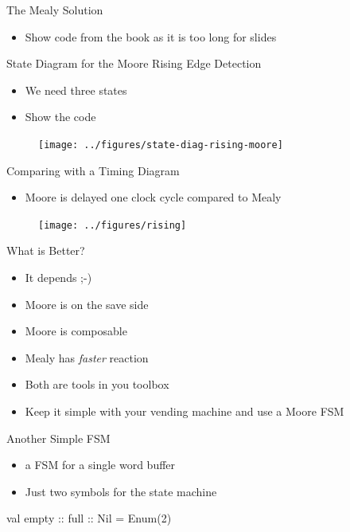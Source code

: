 \begin{frame}[fragile]{The Mealy Solution}
\begin{itemize}
\item Show code from the book as it is too long for slides
\end{itemize}
\end{frame}

\begin{frame}[fragile]{State Diagram for the Moore Rising Edge Detection}
\begin{itemize}
\item We need three states
\item Show the code
\end{itemize}
\begin{figure}
  \texttt{[image: ../figures/state-diag-rising-moore]}
\end{figure}
\end{frame}

\begin{frame}[fragile]{Comparing with a Timing Diagram}
\begin{itemize}
\item Moore is delayed one clock cycle compared to Mealy
\end{itemize}
\begin{figure}
  \texttt{[image: ../figures/rising]}
\end{figure}
\end{frame}

\begin{frame}[fragile]{What is Better?}
\begin{itemize}
\item It depends ;-)
\item Moore is on the save side
\item Moore is composable
\item Mealy has \emph{faster} reaction
\item Both are tools in you toolbox
\item Keep it simple with your vending machine and use a Moore FSM
\end{itemize}
\end{frame}

\begin{frame}[fragile]{Another Simple FSM}
\begin{itemize}
\item a FSM for a single word buffer
\item Just two symbols for the state machine
\end{itemize}
\begin{chisel}
  val empty :: full :: Nil = Enum(2)
\end{chisel}
\end{frame}

